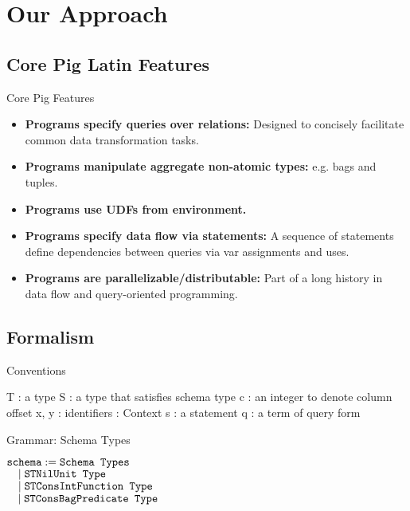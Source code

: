 \section{Our Approach}

\subsection{Core Pig Latin Features}
\begin{frame}{Core Pig Features}
\begin{itemize}
	\item \textbf{Programs specify queries over relations:} Designed to
	concisely facilitate common data transformation tasks.
	\item \textbf{Programs manipulate aggregate non-atomic types:} e.g. bags
	and tuples.
	\item \textbf{Programs use UDFs from environment.}
	\item \textbf{Programs specify data flow via statements:} A sequence of
	statements define dependencies between queries via var assignments and uses.
	\item \textbf{Programs are parallelizable/distributable:} Part of a long
	history in data flow and query-oriented programming.
\end{itemize}
\end{frame}

\subsection{Formalism}
\begin{frame}{Conventions}
\centering
	\begin{flushleft}
		T : a type\newline
		S : a type that satisfies schema type\newline
		c : an integer to denote column offset\newline
		x, y : identifiers\newline
		\textGamma \: : Context\newline
 		s : a statement\newline
 		q : a term of query form\newline 
	\end{flushleft}
\end{frame}

\begin{frame}{Grammar: Schema Types}
\centering
	\begin{flushleft}
	$ \texttt{schema} := \hfill \texttt{Schema Types}\hfill$\\
	$ \quad \mid \texttt{STNil}\hfill \texttt{{Unit Type}}\hfill$\\
   	$ \quad \mid \texttt{STConsInt} \hfill \texttt{Function Type}\hfill$\\
    $ \quad \mid \texttt{STConsBag} \hfill \texttt{Predicate Type}\hfill$\\
	\end{flushleft}
\end{frame}

